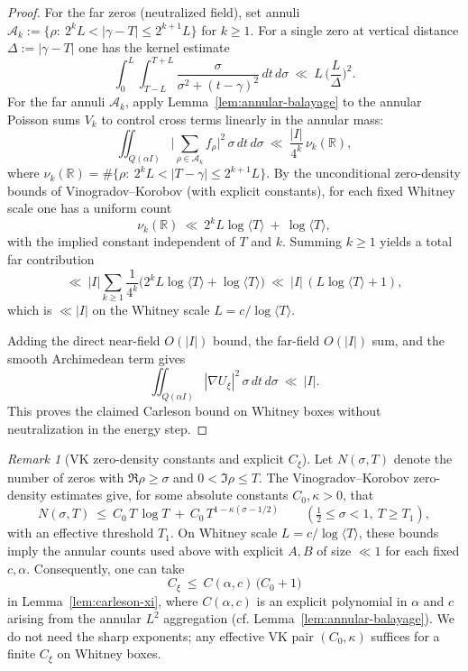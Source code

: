 \documentclass[11pt]{article}
\theoremstyle{definition}
\theoremstyle{remark}
\newtheorem{remark}{Remark}[section]
\newcommand{\R}{\mathbb{R}}
\begin{document}
\begin{proof}
For the far zeros (neutralized field), set annuli $\mathcal A_k:=\{\rho:\ 2^kL<|\gamma-T|\le 2^{k+1}L\}$ for $k\ge1$. For a single zero at vertical distance $\Delta:=|\gamma-T|$ one has the kernel estimate
\[
 \int_0^{L}\!\int_{T-L}^{T+L} \frac{\sigma}{\sigma^2+(t-\gamma)^2}\,dt\,d\sigma\ \ll\ L\,\Big(\frac{L}{\Delta}\Big)^{\!2}.
\]
For the far annuli $\mathcal A_k$, apply Lemma~\ref{lem:annular-balayage} to the annular Poisson sums $V_k$ to control cross terms linearly in the annular mass:
\[
  \iint_{Q(\alpha I)}\Big|\sum_{\rho\in\mathcal A_k} f_{\rho}\Big|^2\,\sigma\,dt\,d\sigma\ \ll\ \frac{|I|}{4^k}\,\nu_k(\R),
\]
where $\nu_k(\R)=\#\{\rho:\ 2^kL<|T-\gamma|\le 2^{k+1}L\}$. By the unconditional zero-density bounds of Vinogradov–Korobov (with explicit constants), for each fixed Whitney scale one has a uniform count
\[ \nu_k(\R)\ \ll\ 2^kL\log\langle T\rangle\ +\ \log\langle T\rangle, \]
with the implied constant independent of $T$ and $k$.
Summing $k\ge1$ yields a total far contribution
\[ \ll\ |I|\sum_{k\ge1}\frac{1}{4^k}\big(2^kL\log\langle T\rangle+\log\langle T\rangle\big)\ \ll\ |I|\,(L\log\langle T\rangle+1), \]
which is $\ll |I|$ on the Whitney scale $L=c/\log\langle T\rangle$.

Adding the direct near-field $O(|I|)$ bound, the far-field $O(|I|)$ sum, and the smooth Archimedean term gives
\[
 \iint_{Q(\alpha I)} |\nabla U_\xi|^2\,\sigma\,dt\,d\sigma\ \ll\ |I|.
\]
This proves the claimed Carleson bound on Whitney boxes without neutralization in the energy step.
\end{proof}
\begin{remark}[VK zero-density constants and explicit $C_\xi$]
Let $N(\sigma,T)$ denote the number of zeros with $\Re\rho\ge \sigma$ and $0<\Im\rho\le T$. The Vinogradov–Korobov zero-density estimates give, for some absolute constants $C_0,\kappa>0$, that
\[
  N(\sigma,T)\ \le\ C_0\,T\,\log T\ +\ C_0\,T^{1-\kappa(\sigma-1/2)}\qquad (\tfrac12\le \sigma<1,\ T\ge T_1),
\]
with an effective threshold $T_1$. On Whitney scale $L=c/\log\langle T\rangle$, these bounds imply the annular counts used above with explicit $A,B$ of size $\ll 1$ for each fixed $c,\alpha$. Consequently, one can take
\[
  C_\xi\ \le\ C(\alpha,c)\,\big(C_0+1\big)
\]
in Lemma~\ref{lem:carleson-xi}, where $C(\alpha,c)$ is an explicit polynomial in $\alpha$ and $c$ arising from the annular $L^2$ aggregation (cf. Lemma~\ref{lem:annular-balayage}). We do not need the sharp exponents; any effective VK pair $(C_0,\kappa)$ suffices for a finite $C_\xi$ on Whitney boxes.
\end{remark}
\end{document}
